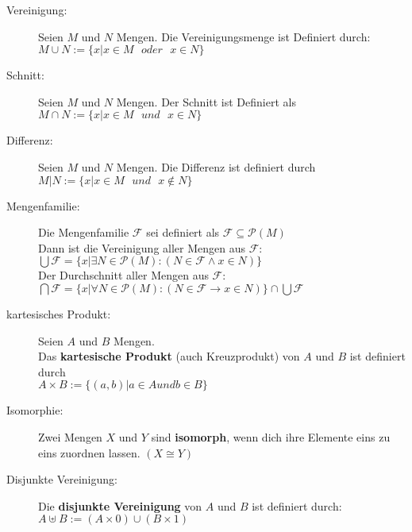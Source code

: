 \begin{description}
  \item [Vereinigung:] 
    Seien $M$ und $N$ Mengen. Die Vereinigungsmenge ist Definiert durch: 
    $M \cup N := \{x | x \in M \text{ }oder\text{ } x \in N\}$

  \item [Schnitt:] 
    Seien $M$ und $N$ Mengen. Der Schnitt ist Definiert als 
    $M \cap N := \{x | x \in M \text{ }und\text{ } x \in N\}$

  \item [Differenz:] 
    Seien $M$ und $N$ Mengen. Die Differenz ist definiert durch 
    $M | N := \{x | x \in M \text{ }und\text{ } x \notin N\}$

  \item [Mengenfamilie:] 
    Die Mengenfamilie $\mathcal{F}$ sei definiert als 
    $\mathcal{F} \subseteq \mathcal{P}(M)$ \\
    Dann ist die Vereinigung aller Mengen aus $\mathcal{F}$:\\
    $\bigcup\mathcal{F} = \{x | \exists N \in \mathcal{P}(M) : (N \in \mathcal{F} \wedge x \in N)\}$ \\
    Der Durchschnitt aller Mengen aus $\mathcal{F}$: \\ 
    $\bigcap \mathcal{F} = \{x | \forall N \in \mathcal{P}(M) : (N \in \mathcal{F} \rightarrow x \in N)\} \cap \bigcup \mathcal{F}$ 

  \item [kartesisches Produkt:] 
    Seien $A$ und $B$ Mengen.\\
    Das \textbf{kartesische Produkt} (auch Kreuzprodukt) von $A$ und $B$ ist 
    definiert durch\\
    $A \times B := \{(a,b) | a \in A und b \in B\}$

  \item [Isomorphie:] 
    Zwei Mengen $X$ und $Y$ sind \textbf{isomorph}, wenn dich ihre Elemente eins
    zu eins zuordnen lassen. $(X \cong Y)$

  \item [Disjunkte Vereinigung:] 
    Die \textbf{disjunkte Vereinigung} von $A$ und $B$ ist definiert durch: \\
    $A \uplus B := (A \times {0}) \cup (B \times {1})$
\end{description}

  
